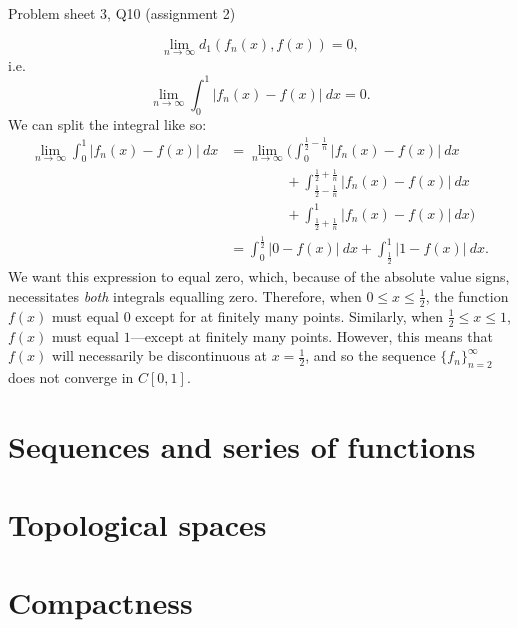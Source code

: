 \begin{problem}{Problem sheet 3, Q10 (assignment 2)}{}
\begin{enumerate}
            $$ \lim_{n \to \infty} d_1(f_n(x), f(x)) = 0 , $$
        i.e.
            $$ \lim_{n \to \infty} \int_0^1 \bigl\vert
                f_n(x) - f(x) \bigr\vert \ dx = 0 . $$
        We can split the integral like so:
            \begin{align*}
                \lim_{n \to \infty} \int_0^1 \bigl\vert
                f_n(x) - f(x) \bigr\vert \ dx
                &= \lim_{n \to \infty} \biggl(
                    \int_0^{\frac{1}{2} - \frac{1}{n}}
                    \bigl\vert f_n(x) - f(x) \bigr\vert \ dx \\
                &\qquad \qquad + \int_{\frac{1}{2} - \frac{1}{n}}^
                    {\frac{1}{2} + \frac{1}{n}}
                    \bigl\vert f_n(x) - f(x) \bigr\vert \ dx \\
                &\qquad \qquad + \int_{\frac{1}{2} + \frac{1}{n}}^1 
                    \bigl\vert f_n(x) - f(x) \bigr\vert \ dx \biggr) \\
                &= \int_0^\frac{1}{2}
                    \bigl\vert 0 - f(x) \bigr\vert \ dx
                    + \int_\frac{1}{2}^1
                    \bigl\vert 1 - f(x) \bigr\vert \ dx .
            \end{align*}
        We want this expression to equal zero, which, because of the absolute value signs, necessitates \textit{both} integrals equalling zero. Therefore, when $0 \leq x \leq \frac{1}{2}$, the function $f(x)$ must equal $0$ except for at finitely many points. Similarly, when $\frac{1}{2} \leq x \leq 1$, $f(x)$ must equal $1$---except at finitely many points. However, this means that $f(x)$ will necessarily be discontinuous at $x = \frac{1}{2}$, and so the sequence $\{ f_n \}_{n = 2}^\infty$ does not converge in $C[0, 1]$.
    \end{enumerate}

\end{problem}


\section{Sequences and series of functions}

\section{Topological spaces}

\section{Compactness}